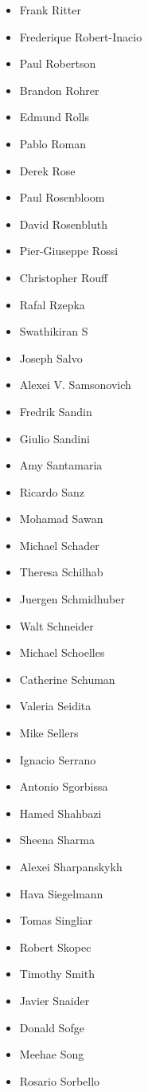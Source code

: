 \documentclass[10pt,fleqn,openany]{book} %
\begin{document}
\begin{multicols}{2}
\begin{itemize}
			\item Frank Ritter
			\item Frederique Robert-Inacio
			\item Paul Robertson
			\item Brandon Rohrer
			\item Edmund Rolls
			\item Pablo Roman
			\item Derek Rose
			\item Paul Rosenbloom
			\item David Rosenbluth
			\item Pier-Giuseppe Rossi
			\item Christopher Rouff
			\item Rafal Rzepka
			\item Swathikiran S
			\item Joseph Salvo
			\item Alexei V. Samsonovich
			\item Fredrik Sandin
			\item Giulio Sandini
			\item Amy Santamaria
			\item Ricardo Sanz
			\item Mohamad Sawan
			\item Michael Schader
			\item Theresa Schilhab
			\item Juergen Schmidhuber
			\item Walt Schneider
			\item Michael Schoelles
			\item Catherine Schuman
			\item Valeria Seidita
			\item Mike Sellers
			\item Ignacio Serrano
			\item Antonio Sgorbissa
			\item Hamed Shahbazi
			\item Sheena Sharma
			\item Alexei Sharpanskykh
			\item Hava Siegelmann
			\item Tomas Singliar
			\item Robert Skopec
			\item Timothy Smith
			\item Javier Snaider
			\item Donald Sofge
			\item Meehae Song
			\item Rosario Sorbello

\end{itemize}
\end{multicols}
\end{document}
